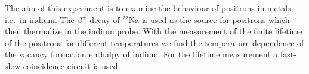 The aim of this experiment is to examine the behaviour of positrons in metals, i.e.\ in indium. The $\beta^+$-decay of $^{22}$Na is used as the source for positrons which then thermalize in the indium probe. With the measurement of the finite lifetime of the positrons for different temperatures we find the temperature dependence of the vacancy formation enthalpy of indium. For the lifetime measurement a fast-slow-coincidence circuit is used. 

